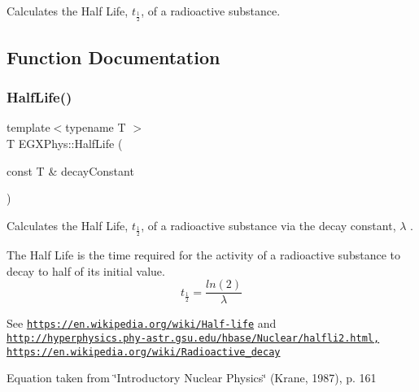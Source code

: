 Calculates the Half Life, $t_{\frac{1}{2}}$, of a radioactive substance. 

\subsection{Function Documentation}
\mbox{\label{group___half_life_ga21d268f154fb91c1c556bbfa7fe83ac1}} 
\subsubsection{\texorpdfstring{Half\+Life()}{HalfLife()}}
{\footnotesize\ttfamily template$<$typename T $>$ \\
T E\+G\+X\+Phys\+::\+Half\+Life (\begin{DoxyParamCaption}\item[{const T \&}]{decay\+Constant }\end{DoxyParamCaption})}



Calculates the Half Life, $t_{\frac{1}{2}}$, of a radioactive substance via the decay constant, $\lambda$ . 

The Half Life is the time required for the activity of a radioactive substance to decay to half of its initial value. \[t_{\frac{1}{2}}=\frac{ln(2)}{\lambda}\]

See \href{https://en.wikipedia.org/wiki/Half-life}{\tt https\+://en.\+wikipedia.\+org/wiki/\+Half-\/life} and \href{http://hyperphysics.phy-astr.gsu.edu/hbase/Nuclear/halfli2.html,}{\tt http\+://hyperphysics.\+phy-\/astr.\+gsu.\+edu/hbase/\+Nuclear/halfli2.\+html,} \href{https://en.wikipedia.org/wiki/Radioactive_decay}{\tt https\+://en.\+wikipedia.\+org/wiki/\+Radioactive\+\_\+decay}

Equation taken from \char`\"{}\+Introductory Nuclear Physics\char`\"{} (Krane, 1987), p. 161


